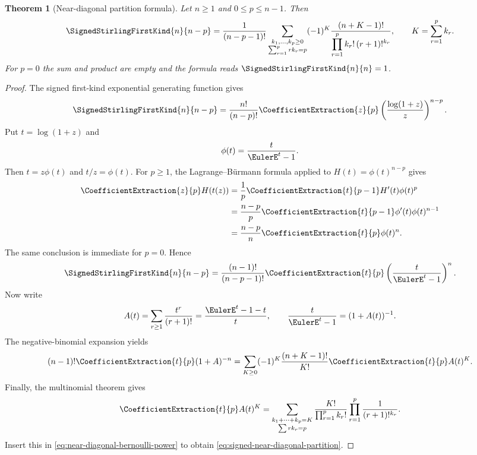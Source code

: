 \documentclass[11pt,a4paper,oneside,openany]{book}
\newtheorem{theorem}{Theorem}[chapter]
\theoremstyle{definition}
\theoremstyle{remark}
\begin{document}
\begin{theorem}[Near-diagonal partition formula]
\label{thm:signed-near-diagonal-partition}
Let $n\ge1$ and $0\le p\le n-1$.  Then
\begin{equation}
\label{eq:signed-near-diagonal-partition}
 \SignedStirlingFirstKind{n}{n-p}=\frac{1}{(n-p-1)!}
 \sum_{\substack{k_1,\ldots,k_p\ge0\\
                  \sum_{r=1}^{p}r k_r=p}}
 (-1)^K
 \frac{(n+K-1)!}
 {\displaystyle\prod_{r=1}^{p}k_r!\,(r+1)!^{k_r}},
 \qquad K=\sum_{r=1}^{p}k_r.
\end{equation}
For $p=0$ the sum and product are empty and the formula reads $\SignedStirlingFirstKind{n}{n}=1$.
\end{theorem}
\begin{proof}
The signed first-kind exponential generating function gives
\begin{equation}
\label{eq:near-diagonal-log-coefficient}
 \SignedStirlingFirstKind{n}{n-p}=\frac{n!}{(n-p)!}
 \CoefficientExtraction{z}{p}\left(\frac{\log(1+z)}{z}\right)^{n-p}.
\end{equation}
Put $t=\log(1+z)$ and
\[
 \phi(t)=\frac{t}{\EulerE^t-1}.
\]
Then $t=z\phi(t)$ and $t/z=\phi(t)$.  For $p\ge1$, the
Lagrange--B\"urmann formula applied to $H(t)=\phi(t)^{n-p}$ gives
\begin{align*}
 \CoefficientExtraction{z}{p}H(t(z))
 &=\frac1p\CoefficientExtraction{t}{p-1}H'(t)\phi(t)^p\\
 &=\frac{n-p}{p}\CoefficientExtraction{t}{p-1}\phi'(t)\phi(t)^{n-1}\\
 &=\frac{n-p}{n}\CoefficientExtraction{t}{p}\phi(t)^n.
\end{align*}
The same conclusion is immediate for $p=0$.  Hence
\begin{equation}
\label{eq:near-diagonal-bernoulli-power}
 \SignedStirlingFirstKind{n}{n-p}=\frac{(n-1)!}{(n-p-1)!}
 \CoefficientExtraction{t}{p}\left(\frac{t}{\EulerE^t-1}\right)^n.
\end{equation}
Now write
\[
 A(t)=\sum_{r\ge1}\frac{t^r}{(r+1)!}
     =\frac{\EulerE^t-1-t}{t},
 \qquad \frac{t}{\EulerE^t-1}=(1+A(t))^{-1}.
\]
The negative-binomial expansion yields
\[
 (n-1)!\CoefficientExtraction{t}{p}(1+A)^{-n}
 =\sum_{K\ge0}(-1)^K\frac{(n+K-1)!}{K!}\CoefficientExtraction{t}{p}A(t)^K.
\]
Finally, the multinomial theorem gives
\[
 \CoefficientExtraction{t}{p}A(t)^K
 =\sum_{\substack{k_1+\cdots+k_p=K\\
                   \sum r k_r=p}}
   \frac{K!}{\prod_{r=1}^{p}k_r!}
   \prod_{r=1}^{p}\frac1{(r+1)!^{k_r}}.
\]
Insert this in \eqref{eq:near-diagonal-bernoulli-power} to obtain
\eqref{eq:signed-near-diagonal-partition}.
\end{proof}
\end{document}

